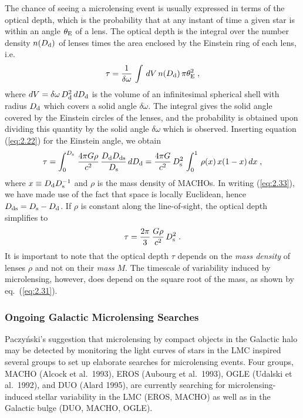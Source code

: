 \documentclass[a4paper,10pt]{article} %
\begin{document}
The chance of seeing a microlensing event is usually expressed in
terms of the optical depth, which is the probability that at any
instant of time a given star is within an angle $\theta_{\rm E}$ of a
lens. The optical depth is the integral over the number density
$n(D_{\rm d})$ of lenses times the area enclosed by the Einstein ring
of each lens, i.e.
\begin{equation}
  \tau = \frac{1}{\delta\omega}\,
  \int\,dV\,n(D_{\rm d})\,\pi\theta_{\rm E}^2\;,
\label{eq:2.32}
\end{equation}
where $dV=\delta\omega\,D_{\rm d}^2\,dD_{\rm d}$ is the volume of an
infinitesimal spherical shell with radius $D_{\rm d}$ which covers a
solid angle $\delta\omega$. The integral gives the solid angle covered
by the Einstein circles of the lenses, and the probability is obtained
upon dividing this quantity by the solid angle $\delta\omega$ which is
observed. Inserting equation (\ref{eq:2.22}) for the Einstein angle,
we obtain
\begin{equation}
  \tau = \int_0^{D_{\rm s}}\,\frac{4\pi G\rho}{c^2}\,
  \frac{D_{\rm d}D_{\rm ds}}{D_{\rm s}}\,dD_{\rm d} =
  \frac{4\pi G}{c^2}\,D_{\rm s}^2\,\int_0^1\,
  \rho(x)\,x(1-x)\,dx\;,
\label{eq:2.33}
\end{equation}
where $x\equiv D_{\rm d}D_{\rm s}^{-1}$ and $\rho$ is the mass density
of MACHOs. In writing (\ref{eq:2.33}), we have made use of the fact
that space is locally Euclidean, hence $D_{\rm ds}=D_{\rm s}-D_{\rm
d}$. If $\rho$ is constant along the line-of-sight, the optical depth
simplifies to
\begin{equation}
  \tau = \frac{2\pi}{3}\,\frac{G\rho}{c^2}\,D_{\rm s}^2\;.
\label{eq:2.34}
\end{equation}
It is important to note that the optical depth $\tau$ depends on the
{\em mass density\/} of lenses $\rho$ and not on their {\em mass\/}
$M$. The timescale of variability induced by microlensing, however,
does depend on the square root of the mass, as shown by eq.\
(\ref{eq:2.31}).

\subsubsection{Ongoing Galactic Microlensing Searches}
\label{NB:subsubsect2.2.2}

Paczy\'nski's suggestion that microlensing by compact objects in the
Galactic halo may be detected by monitoring the light curves of stars
in the LMC inspired several groups to set up elaborate searches for
microlensing events. Four groups, MACHO (Alcock et al.\ 1993), EROS
(Aubourg et al.\ 1993), OGLE (Udalski et al.\ 1992), and DUO (Alard
1995), are currently searching for microlensing-induced stellar
variability in the LMC (EROS, MACHO) as well as in the Galactic bulge
(DUO, MACHO, OGLE).
\end{document}
